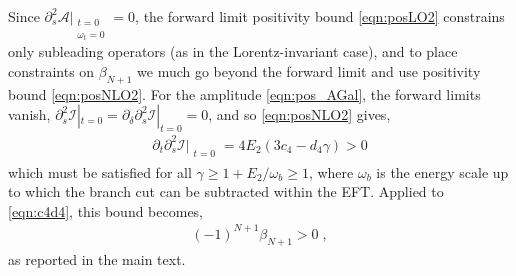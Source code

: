 \documentclass[11pt]{article}
\begin{document}
Since $\partial_s^2 \mathcal{A} |_{\substack{t=0 \\ \omega_t =0 }} = 0$, the forward limit positivity bound \eqref{eqn:posLO2} constrains only subleading operators (as in the Lorentz-invariant case), and to place constraints on $\beta_{N+1}$ we much go beyond the forward limit and use positivity bound \eqref{eqn:posNLO2}. 
%
For the amplitude \eqref{eqn:pos_AGal}, the forward limits vanish, $\partial_s^2 \mathcal{I} |_{t=0} = \partial_\delta \partial_s^2 \mathcal{I} |_{t=0} = 0$, and so \eqref{eqn:posNLO2} gives,
\begin{align}
\partial_t \partial_s^2 \mathcal{I} |_{\substack{ t=0} } = 4 E_2  (3 c_4 - d_4 \gamma )  > 0 
\label{eqn:dt_pos}
\end{align}
which must be satisfied for all $\gamma \geq 1 + E_2/\omega_b \geq 1$, where $\omega_b$ is the energy scale up to which the branch cut can be subtracted within the EFT. 
Applied to \eqref{eqn:c4d4}, this bound becomes,
\begin{align}
 (-1)^{N+1} \beta_{N+1} > 0 \; , 
\end{align}
as reported in the main text. 


\end{document}
